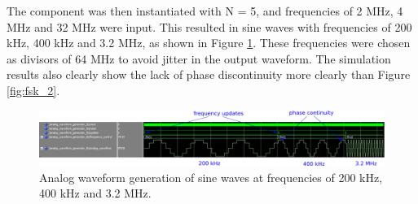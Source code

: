 \documentclass[a4paper, 10pt, titlepage]{article}
\begin{document}
The component was then instantiated with N = 5, and frequencies of 2 MHz, 4 MHz and 32 MHz were input. This resulted in sine waves with frequencies of 200 kHz, 400 kHz and 3.2 MHz, as shown in Figure \ref{fig:analog}. These frequencies were chosen as divisors of 64 MHz to avoid jitter in the output waveform. The simulation results also clearly show the lack of phase discontinuity more clearly than Figure \ref{fig:fsk_2}.

\begin{figure}[!htb]
    \centering
    \includegraphics[width=\linewidth]{analog.PNG}
    \caption{Analog waveform generation of sine waves at frequencies of 200 kHz, 400 kHz and 3.2 MHz.}
    \label{fig:analog}
\end{figure}
\end{document}
